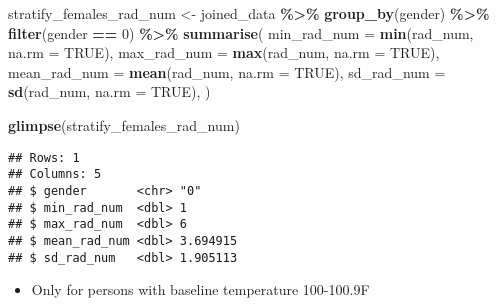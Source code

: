 \documentclass[
]{article}
\newenvironment{Shaded}{\begin{snugshade}}{\end{snugshade}}
\newcommand{\AttributeTok}[1]{\textcolor[rgb]{0.13,0.29,0.53}{#1}}
\newcommand{\ConstantTok}[1]{\textcolor[rgb]{0.56,0.35,0.01}{#1}}
\newcommand{\DecValTok}[1]{\textcolor[rgb]{0.00,0.00,0.81}{#1}}
\newcommand{\FunctionTok}[1]{\textcolor[rgb]{0.13,0.29,0.53}{\textbf{#1}}}
\newcommand{\NormalTok}[1]{#1}
\newcommand{\OtherTok}[1]{\textcolor[rgb]{0.56,0.35,0.01}{#1}}
\newcommand{\SpecialCharTok}[1]{\textcolor[rgb]{0.81,0.36,0.00}{\textbf{#1}}}
\providecommand{\tightlist}{%
  \setlength{\itemsep}{0pt}\setlength{\parskip}{0pt}}
\begin{document}
\begin{Shaded}
\begin{Highlighting}[]
\NormalTok{stratify\_females\_rad\_num }\OtherTok{\textless{}{-}}\NormalTok{ joined\_data }\SpecialCharTok{\%\textgreater{}\%}
  \FunctionTok{group\_by}\NormalTok{(gender) }\SpecialCharTok{\%\textgreater{}\%} \FunctionTok{filter}\NormalTok{(gender }\SpecialCharTok{==} \DecValTok{0}\NormalTok{) }\SpecialCharTok{\%\textgreater{}\%} 
  \FunctionTok{summarise}\NormalTok{(}
    \AttributeTok{min\_rad\_num =} \FunctionTok{min}\NormalTok{(rad\_num, }\AttributeTok{na.rm =} \ConstantTok{TRUE}\NormalTok{),}
    \AttributeTok{max\_rad\_num =} \FunctionTok{max}\NormalTok{(rad\_num, }\AttributeTok{na.rm =} \ConstantTok{TRUE}\NormalTok{),}
    \AttributeTok{mean\_rad\_num =} \FunctionTok{mean}\NormalTok{(rad\_num, }\AttributeTok{na.rm =} \ConstantTok{TRUE}\NormalTok{),}
    \AttributeTok{sd\_rad\_num =} \FunctionTok{sd}\NormalTok{(rad\_num, }\AttributeTok{na.rm =} \ConstantTok{TRUE}\NormalTok{),}
\NormalTok{  ) }

\FunctionTok{glimpse}\NormalTok{(stratify\_females\_rad\_num)}
\end{Highlighting}
\end{Shaded}

\begin{verbatim}
## Rows: 1
## Columns: 5
## $ gender       <chr> "0"
## $ min_rad_num  <dbl> 1
## $ max_rad_num  <dbl> 6
## $ mean_rad_num <dbl> 3.694915
## $ sd_rad_num   <dbl> 1.905113
\end{verbatim}

\begin{itemize}
\tightlist
\item
  Only for persons with baseline temperature 100-100.9F
\end{itemize}
\end{document}
